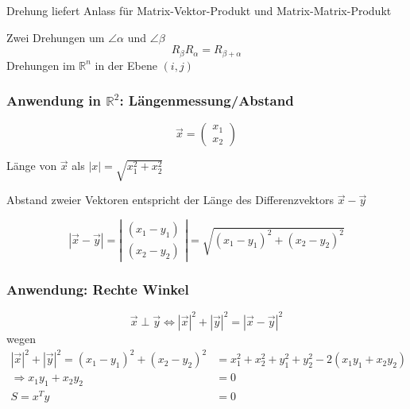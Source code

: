 \begin{note}
Drehung liefert Anlass für Matrix-Vektor-Produkt und Matrix-Matrix-Produkt
\end{note}

\noindent Zwei Drehungen um $\angle \alpha$ und $\angle \beta$
\begin{equation*}
	R_{\beta} R_{\alpha} = R_{\beta + \alpha}
\end{equation*}
%
Drehungen im $\mathbb{R}^{n}$ in der Ebene $(i, j)$


\subsubsection*{Anwendung in $\mathbb{R}^{2}$: Längenmessung/Abstand}

\begin{equation*}
	\vec{x} = 
 	\begin{pmatrix}
		x_{1} \\
		x_{2}
 	\end{pmatrix}
\end{equation*}

\begin{definition}Länge von $\vec{x}$ als $|x| = \sqrt{x_1^2 + x_2^2}$
\end{definition}


\begin{note}
Abstand zweier Vektoren entspricht der Länge des Differenzvektors $\vec{x} - \vec{y}$
\end{note}

\begin{equation*}
	|\vec{x} - \vec{y}| = \left|
 	\begin{array}{cc}
		(x_1 - y_1)\\
		(x_2 - y_2)
 	\end{array}\right| = 
 	\sqrt{(x_1 - y_1)^2 + (x_2 - y_2)^2}
\end{equation*}

\subsubsection*{Anwendung: Rechte Winkel}

\begin{theorem}
\begin{equation*}
	\vec{x} \perp \vec{y} \Leftrightarrow |\vec{x}|^2 + |\vec{y}|^2 = |\vec{x} - \vec{y}|^2
\end{equation*}
wegen
\begin{align*}
	|\vec{x}|^2 + |\vec{y}|^2 = (x_1 - y_1)^2 + (x_2 - y_2)^2 &= x_1^2 + x_2^2 + y_1^2 + y_2^2 - 2(x_1 y_1 + x_2 y_2) \\
	\Rightarrow x_1 y_1 + x_2 y_2 &= 0 \\
	S = x^T y &= 0
\end{align*}
\end{theorem}

